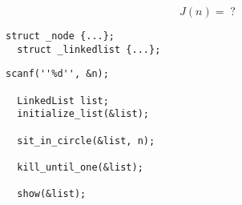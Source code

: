 \begin{frame}{}

  \[
    J(n) = \; ?
  \]
\end{frame}

\begin{frame}{}

  \vspace{0.50cm}
\end{frame}

\begin{frame}[fragile]{}
  \begin{lstlisting}[style = Cstyle]
  struct _node {...};
  struct _linkedlist {...};
  \end{lstlisting}

  \pause
  \begin{lstlisting}[style = Cstyle]
  scanf(''%d'', &n);

  LinkedList list;
  initialize_list(&list);

  sit_in_circle(&list, n);

  kill_until_one(&list);

  show(&list);
  \end{lstlisting}
\end{frame}
